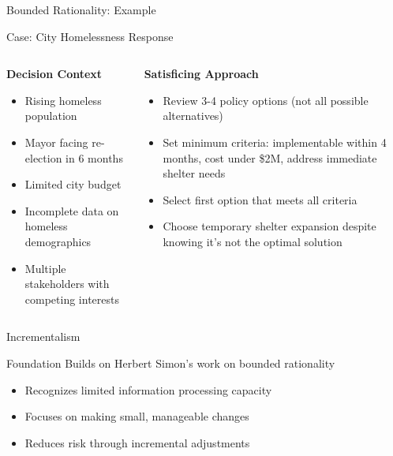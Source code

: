 \documentclass[10pt]{beamer}
\begin{document}
\begin{frame}{Bounded Rationality: Example}
\begin{block}{Case: City Homelessness Response}
\end{block}
\begin{columns}
\begin{column}{0.5\textwidth}
\textbf{Decision Context}
\begin{itemize}
\item Rising homeless population
\item Mayor facing re-election in 6 months
\item Limited city budget
\item Incomplete data on homeless demographics
\item Multiple stakeholders with competing interests
\end{itemize}
\end{column}
\begin{column}{0.5\textwidth}
\textbf{Satisficing Approach}
\begin{itemize}
\item Review 3-4 policy options (not all possible alternatives)
\item Set minimum criteria: implementable within 4 months, cost under \$2M, address immediate shelter needs
\item Select first option that meets all criteria
\item Choose temporary shelter expansion despite knowing it's not the optimal solution
\end{itemize}
\end{column}
\end{columns}
\end{frame}

\begin{frame}{Incrementalism}
\begin{block}{Foundation}
Builds on Herbert Simon's work on bounded rationality
\begin{itemize}
\item Recognizes limited information processing capacity
\item Focuses on making small, manageable changes
\item Reduces risk through incremental adjustments
\end{itemize}
\end{block}
\end{frame}
\end{document}
